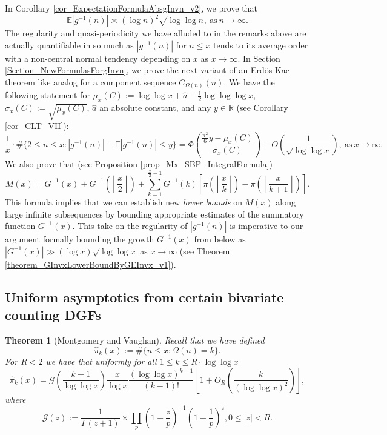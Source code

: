 \documentclass[11pt,reqno,a4letter]{article}
\numberwithin{figure}{section}
\numberwithin{table}{section}
\newcommand{\Floor}[2]{\ensuremath{\left\lfloor \frac{#1}{#2} \right\rfloor}}
\theoremstyle{plain}
\newtheorem{theorem}{Theorem}
\numberwithin{theorem}{section}
\theoremstyle{definition}
\begin{document}
In Corollary \ref{cor_ExpectationFormulaAbsgInvn_v2}, we prove that 
\[
\mathbb{E}|g^{-1}(n)| \asymp (\log n)^2 \sqrt{\log\log n}, 
     \mathrm{\ as\ } n \rightarrow \infty. 
\]
The regularity and quasi-periodicity we have alluded to in the remarks above are actually 
quantifiable in so much as $|g^{-1}(n)|$ for $n \leq x$ 
tends to its average order with a non-central normal tendency 
depending on $x$ as $x \rightarrow \infty$. 
In Section \ref{Section_NewFormulasForgInvn}, 
we prove the next variant of an Erd\"os-Kac theorem like analog
for a component sequence $C_{\Omega(n)}(n)$. 
We have the following statement for 
$\mu_x(C) := \log\log x + \hat{a} - \frac{1}{2}\log\log\log x$, $\sigma_x(C) := \sqrt{\mu_x(C)}$, 
$\hat{a}$ an absolute constant, and any $y \in \mathbb{R}$ (see 
Corollary \ref{cor_CLT_VII}): 
\[
\frac{1}{x} \cdot \#\{2 \leq n \leq x: |g^{-1}(n)| - \mathbb{E}|g^{-1}(n)| \leq y\} = 
     \Phi\left(\frac{\frac{\pi^2}{6}y - \mu_x(C)}{\sigma_x(C)}\right) + 
     O\left(\frac{1}{\sqrt{\log\log x}}\right), 
     \mathrm{\ as\ } x \rightarrow \infty. 
\]
We also prove that (see Proposition \ref{prop_Mx_SBP_IntegralFormula}) 
\begin{equation} 
\label{eqn_Mx_gInvnPixk_formula_v2} 
M(x) = G^{-1}(x) + G^{-1}\left(\Floor{x}{2}\right) + 
     \sum_{k=1}^{\frac{x}{2}-1} G^{-1}(k) \left[ 
     \pi\left(\Floor{x}{k}\right) - \pi\left(\Floor{x}{k+1}\right) 
     \right]. 
\end{equation} 
This formula 
implies that we can establish new \emph{lower bounds} on $M(x)$ along large infinite subsequences 
by bounding appropriate estimates of the summatory function $G^{-1}(x)$. 
This take on the regularity of $|g^{-1}(n)|$ is imperative to our argument formally bounding the growth 
$G^{-1}(x)$ from below as $|G^{-1}(x)| \gg (\log x) \sqrt{\log\log x}$ as $x \rightarrow \infty$ 
(see Theorem \ref{theorem_GInvxLowerBoundByGEInvx_v1}). 

\subsection{Uniform asymptotics from certain bivariate counting DGFs} 

\begin{theorem}[Montgomery and Vaughan]
\label{theorem_HatPi_ExtInTermsOfGz} 
Recall that we have defined 
$$\widehat{\pi}_k(x) := \#\{n \leq x: \Omega(n)=k\}.$$ 
For $R < 2$ we have that uniformly for all $1 \leq k \leq R \cdot \log\log x$ 
\[
\widehat{\pi}_k(x) = \mathcal{G}\left(\frac{k-1}{\log\log x}\right) \frac{x}{\log x} 
     \frac{(\log\log x)^{k-1}}{(k-1)!} \left[1 + O_R\left(\frac{k}{(\log\log x)^2}\right)\right], 
\]
where 
\[
\mathcal{G}(z) := \frac{1}{\Gamma(z+1)} \times 
     \prod_p \left(1-\frac{z}{p}\right)^{-1} \left(1-\frac{1}{p}\right)^z, 0 \leq |z| < R. 
\]
\end{theorem} 
\end{document}
